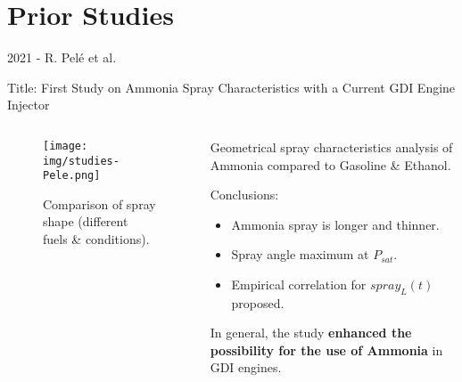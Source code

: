 \section{Prior Studies}

\begin{frame}{2021 - R. Pelé et al.}

    Title: First Study on Ammonia Spray Characteristics with a Current GDI Engine Injector

    \vspace{9pt}

    \begin{columns}[c, onlytextwidth]

        \begin{column}{0.45\textwidth}

            \begin{figure}[H]
                \centering
                \texttt{[image: img/studies-Pele.png]}
                \caption{Comparison of spray shape (different fuels \& conditions).}
            \end{figure}

        \end{column}

        \begin{column}{0.5\textwidth}

            Geometrical spray characteristics analysis of Ammonia compared to Gasoline \& Ethanol.

            Conclusions:
            \begin{itemize}
                \item Ammonia spray is longer and thinner.
                \item Spray angle maximum at $P_{sat}$.
                \item Empirical correlation for $spray_L(t)$ proposed.
            \end{itemize}

            In general, the study \textbf{enhanced the possibility for the use of Ammonia} in GDI engines.

        \end{column}

    \end{columns}

\end{frame}






